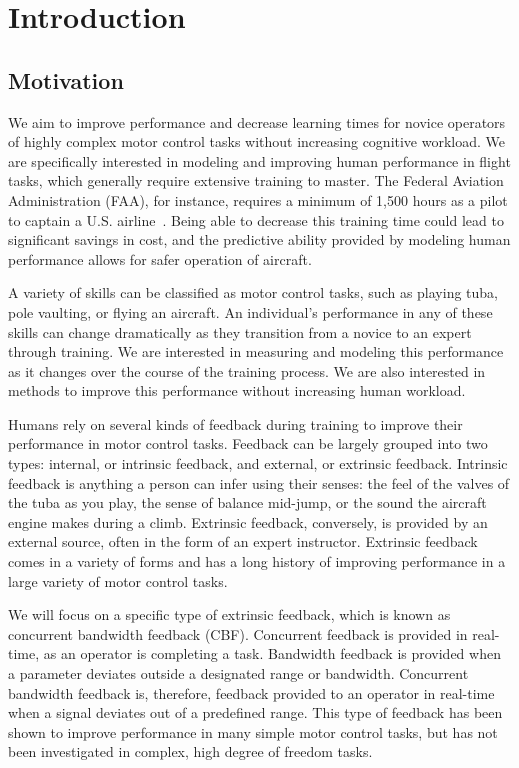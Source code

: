 \chapter{Introduction}

\section{Motivation}
\label{sec:intro_overview}
We aim to improve performance and decrease learning times for novice operators of highly complex motor control tasks without increasing cognitive workload.
We are specifically interested in modeling and improving human performance in flight tasks, which generally require extensive training to master.
The Federal Aviation Administration (FAA), for instance, requires a minimum of 1,500 hours as a pilot to captain a U.S. airline~\citep{FAA}.
Being able to decrease this training time could lead to significant savings in cost, and the predictive ability provided by modeling human performance allows for safer operation of aircraft.

A variety of skills can be classified as motor control tasks, such as playing tuba, pole vaulting, or flying an aircraft.
An individual's performance in any of these skills can change dramatically as they transition from a novice to an expert through training.
We are interested in measuring and modeling this performance as it changes over the course of the training process.
We are also interested in methods to improve this performance without increasing human workload.

Humans rely on several kinds of feedback during training to improve their performance in motor control tasks.
Feedback can be largely grouped into two types: internal, or intrinsic feedback, and external, or extrinsic feedback.
Intrinsic feedback is anything a person can infer using their senses: the feel of the valves of the tuba as you play, the sense of balance mid-jump, or the sound the aircraft engine makes during a climb.
Extrinsic feedback, conversely, is provided by an external source, often in the form of an expert instructor.
Extrinsic feedback comes in a variety of forms and has a long history of improving performance in a large variety of motor control tasks.

We will focus on a specific type of extrinsic feedback, which is known as concurrent bandwidth feedback (CBF).
Concurrent feedback is provided in real-time, as an operator is completing a task.
Bandwidth feedback is provided when a parameter deviates outside a designated range or bandwidth.
Concurrent bandwidth feedback is, therefore, feedback provided to an operator in real-time when a signal deviates out of a predefined range.
This type of feedback has been shown to improve performance in many simple motor control tasks, but has not been investigated in complex, high degree of freedom tasks.

